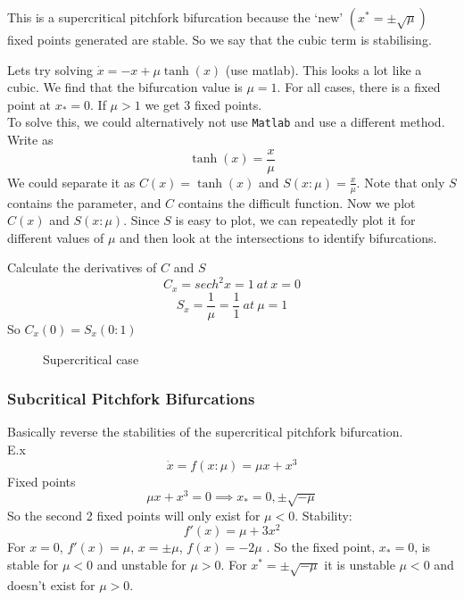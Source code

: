 \documentclass{/home/janmebows/Documents/LatexTemplates/myassignment}
\begin{document}
This is a supercritical pitchfork bifurcation because the `new' $(x^* = \pm \sqrt{\mu})$ fixed points generated are stable. So we say that the cubic term is stabilising.



Lets try solving $\dot{x} = -x + \mu \tanh(x)$ (use matlab). This looks a lot like a cubic.
We find that the bifurcation value is $\mu = 1$. For all cases, there is a fixed point at $x_* = 0$. If $\mu >1$ we get 3 fixed points. \\
To solve this, we could alternatively not use \verb|Matlab| and use a different method. Write as
\[\tanh(x) = \frac{x}{\mu}\]
We could separate it as $C(x) = \tanh(x)$ and $S(x:\mu) =\frac{x}{\mu}$. Note that only $S$ contains the parameter, and $C$ contains the difficult function. Now we plot $C(x)$ and $S(x:\mu)$. Since $S$ is easy to plot, we can repeatedly plot it for different values of $\mu$ and then look at the intersections to identify bifurcations. 

Calculate the derivatives of $C$ and $S$
\[C_x = sech^2 x =1 \ at \ x=0 \]
\[S_x = \frac1\mu = \frac11 \ at \ \mu = 1\]
So $C_x(0) = S_x(0:1)$

\begin{figure}[h]
\centering
{}
\caption{Supercritical case}
\end{figure}


\subsubsection{Subcritical Pitchfork Bifurcations}
Basically reverse the stabilities of the supercritical pitchfork bifurcation. \\
E.x 
\[\dot{x} = f(x:\mu) = \mu x + x^3\]
Fixed points 
\[\mu x + x^3 = 0 \implies x_* = 0 , \pm \sqrt{-\mu}\]
So the second 2 fixed points will only exist for $\mu < 0$.
Stability:
\[f'(x) = \mu + 3x^2\]
For $x= 0$, $f'(x) = \mu$, $x=\pm\mu$, $f(x) = -2\mu$ .
So the fixed point, $x_*=0$,  is stable for $\mu <0$ and unstable for $\mu >0$.
For $x^* = \pm \sqrt{-\mu}$ it is unstable $\mu <0$ and doesn't exist for $\mu >0$.
\end{document}
